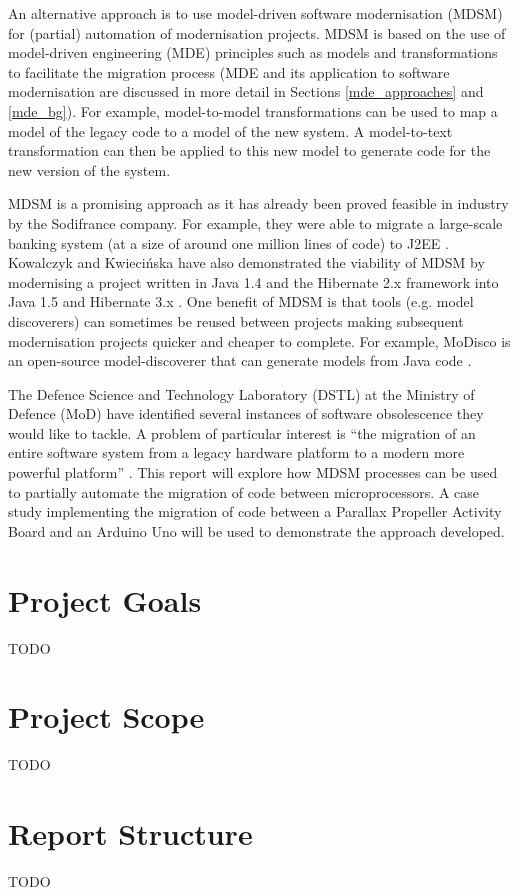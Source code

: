 \documentclass{UoYCSproject}
\begin{document}
An alternative approach is to use model-driven software modernisation (MDSM) for (partial) automation of modernisation projects. MDSM is based on the use of model-driven engineering (MDE) principles such as models and transformations to facilitate the migration process (MDE and its application to software modernisation are discussed in more detail in Sections \ref{mde_approaches} and \ref{mde_bg}). For example, model-to-model transformations can be used to map a model of the legacy code to a model of the new system. A model-to-text transformation can then be applied to this new model to generate code for the new version of the system.

MDSM is a promising approach as it has already been proved feasible in industry by the Sodifrance company. For example, they were able to migrate a large-scale banking system (at a size of around one million lines of code) to J2EE \parencite{fleurey2007model}. Kowalczyk and Kwieci\'nska have also demonstrated the viability of MDSM by modernising a project written in Java 1.4 and the Hibernate 2.x framework into Java 1.5 and Hibernate 3.x \parencite{kowalczyk2009model}. One benefit of MDSM is that tools (e.g. model discoverers) can sometimes be reused between projects making subsequent modernisation projects quicker and cheaper to complete. For example, MoDisco is an open-source model-discoverer that can generate models from Java code \parencite{bruneliere2014modisco}.

The Defence Science and Technology Laboratory (DSTL) at the Ministry of Defence (MoD) have identified several instances of software obsolescence they would like to tackle. A problem of particular interest is ``the migration of an entire software system from a legacy hardware platform to a modern more powerful platform'' \parencite{gerasimou2017technical}. This report will explore how MDSM processes can be used to partially automate the migration of code between microprocessors. A case study implementing the migration of code between a Parallax Propeller Activity Board and an Arduino Uno will be used to demonstrate the approach developed.
 
\section{Project Goals}
TODO
\section{Project Scope}
TODO
\section{Report Structure}
TODO
\end{document}
